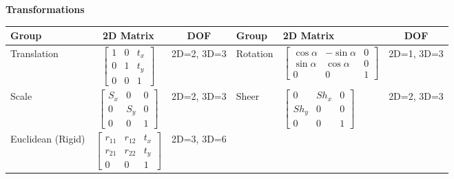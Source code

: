 \documentclass{../cheat}
\begin{document}
\begin{tables}
\footnotesize
\renewcommand*{\thefootnote}{\fnsymbol{footnote}}
\begin{multicols}{2}
	\textbf{Transformations}\\
	\begin{tabularx}{\columnwidth}{| @{ }p{40pt} | c
				 | @{ }c  || @{ }p{35pt} | >{\centering\arraybackslash}X | @{ }c |}
	\hline
	\textbf{Group} & \textbf{2D Matrix} & \textbf{DOF} & \textbf{Group} & \textbf{2D Matrix} & \textbf{DOF}\\
	\hline 
	Translation %
	& $\begin{bmatrix}
		1 & 0 & t_x\\ 0 & 1 & t_y\\0 & 0 & 1\end{bmatrix}$
	& 2D=2, \newline 3D=3 %
	
	&	Rotation %
	& $\begin{bmatrix} \cos\alpha & -\sin\alpha & 0 \\
		\sin\alpha & \cos\alpha & 0 \\ 0 & 0 & 1
		\end{bmatrix}$
	& 2D=1, \newline 3D=3 \\ \hline  %

	Scale %
	& $\begin{bmatrix}
		S_x & 0 & 0\\ 0 & S_y & 0\\0 & 0 & 1\end{bmatrix}$
	& 2D=2, \newline 3D=3 %
	
	& Sheer %
	& $\begin{bmatrix}
		0 & Sh_x & 0\\ Sh_y & 0 & 0\\0 & 0 & 1\end{bmatrix}$
	& 2D=2, \newline 3D=3  \\ \hline %
	
	Euclidean (Rigid)
	& $\begin{bmatrix}
		r_{11} & r_{12}  & t_x\\ r_{21} & r_{22} & t_y\\0 & 0 & 1\end{bmatrix}$
	& 2D=3, \newline 3D=6 %
	

\end{tabularx}
\end{multicols}
\end{tables}
\end{document}
